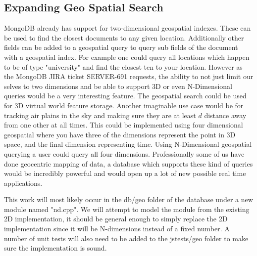 \documentclass{dependencies/acm_proc_article-sp}
\begin{document}
\subsection{Expanding Geo Spatial Search}
MongoDB already has support for two-dimensional geospatial indexes.
These can be used to find the closest documents to any given location.
Additionally other fields can be added to a geospatial query to query sub fields
of the document with a geospatial index. For example one could query all locations
which happen to be of type "university" and find the closest ten to your location.
However as the MongoDB JIRA ticket SERVER-691 \cite{9} requests, the ability to
not just limit our selves to two dimensions and be able to support 3D or even N-Dimensional
queries would be a very interesting feature. The geospatial search could be used for
3D virtual world feature storage. Another imaginable use case would be for tracking air plains
in the sky and making sure they are at least $d$ distance away from one other at all times.
This could be implemented using four dimensional geospatial where you have three of the dimensions
represent the point in 3D space, and the final dimension representing time. Using N-Dimensional
geospatial querying a user could query all four dimensions. Professionally some of us have done geocentric mapping of
data, a database which supports these kind of queries would be incredibly powerful and would open up a lot of new
possible real time applications.

This work will most likely occur in the db/geo folder of the database under a new module named "nd.cpp". We will
attempt to model the module from the existing 2D implementation, it should be general enough to simply replace
the 2D implementation since it will be N-dimensions instead of a fixed number. A number of unit tests will also
need to be added to the jstests/geo folder to make sure the implementation is sound.
%

%
%
\balancecolumns
\end{document}

